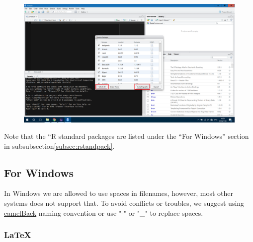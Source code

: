 \documentclass[10pt]{article} %
\begin{document}
\begin{itemize}
      \begin{figure}[h!]
        \centering
        \includegraphics[width=0.7\linewidth]{figs/upgradePackages}
        \caption{}
        \label{fig:upgradepackages}
      \end{figure}

    \end{itemize}

Note that the ``R standard packages are listed under the ``For Windows'' section in subsubsection\ref{subsec:rstandpack}.  \\

  \subsection{For Windows}

  In Windows we are allowed to use spaces in filenames, however, most other systems does not support that.
  To avoid conflicts or troubles, we suggest using \href{https://sanaulla.info/2008/06/25/camelcase-notation-naming-convention-for-programming-languages/}{camelBack} naming convention or use "-" or "\_" to replace spaces.

    \subsubsection{LaTeX}
\end{document}
